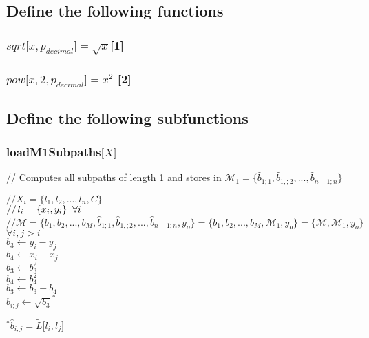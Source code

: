 \documentclass[11pt]{article}
\begin{document}
\subsection{Define the following functions}
\subsubsection{$sqrt\lbrack x,p_{decimal} \rbrack = \sqrt{x}$\hspace{2mm}[1]}
\subsubsection{$pow\lbrack x,2,p_{decimal} \rbrack = x^2$ \hspace{1mm}[2]}


\subsection{Define the following subfunctions}
\subsubsection{loadM1Subpaths$\lbrack X\rbrack$}
\vspace{1mm}
// Computes all subpaths of length 1 and stores in $\mathcal{M}_1 = \{\hat{b}_{1;1},\hat{b}_{1,;2},...,\hat{b}_{n-1;n}\}$
\begin{center}
\vspace{2mm}
$
// X_i = \{l_1,l_2,...,l_n,C\}
$
\\ \vspace{2mm}
$
//\hspace{.5mm} l_i = \{x_i,y_i\} \hspace{2mm} \forall i
$
\\ \vspace{5mm}
$
// \mathcal{M} = \{b_1,b_2,...,b_M,\hat{b}_{1;1},\hat{b}_{1,;2},...,\hat{b}_{n-1;n},y_o\} = \{b_1,b_2,...,b_M,\mathcal{M}_1,y_o\} = \{\mathcal{M},\mathcal{M}_1,y_o\}
$
\\ \vspace{5mm}
$
\forall i,j > i
$
\\ \vspace{2mm}
$
b_3 \leftarrow y_i - y_j
$
\\ \vspace{2mm}
$
b_4 \leftarrow x_i - x_j
$
\\ \vspace{2mm}
$
b_3 \leftarrow b_3^2
$
\\ \vspace{2mm}
$
b_4 \leftarrow b_4^2
$
\\ \vspace{2mm}
$
b_3 \leftarrow b_3 + b_4
$
\\ \vspace{2mm}
$
\hat{b}_{i;j}\leftarrow \sqrt{b_3}^*
$
\end{center}
\vspace{4mm}
$^* \hat{b}_{i;j} = \tilde{L}\lbrack l_i,l_j \rbrack$
\end{document}
